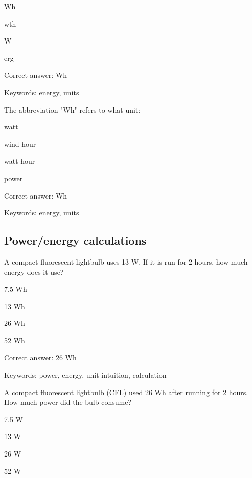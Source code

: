 \begin{answer}
	\item Wh
	\item wth
	\item W
	\item erg
\end{answer}

Correct answer: Wh

Keywords: energy, units

\begin{question}
	\item The abbreviation "Wh" refers to what unit:
\end{question}

\begin{answer}
	\item watt
	\item wind-hour
	\item watt-hour
	\item power
\end{answer}

Correct answer: Wh

Keywords: energy, units

\subsection{Power/energy calculations}

\begin{question}
	\item A compact fluorescent lightbulb uses 13 W. If it is run for 2 hours, how much energy does it use?
\end{question}

\begin{answer}
	\item 7.5 Wh
	\item 13 Wh
	\item 26 Wh
	\item 52 Wh
\end{answer}

Correct answer: 26 Wh

Keywords: power, energy, unit-intuition, calculation

\begin{question}
	\item A compact fluorescent lightbulb (CFL) used 26 Wh after running for 2 hours. How much power did the bulb consume?
\end{question}

\begin{answer}
	\item 7.5 W
	\item 13 W
	\item 26 W
	\item 52 W
\end{answer}

